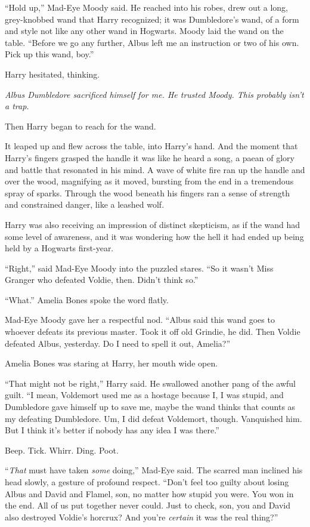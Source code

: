 ``Hold up,'' Mad-Eye Moody said. He reached into his robes, drew out a long, grey-knobbed wand that Harry recognized; it was Dumbledore's wand, of a form and style not like any other wand in Hogwarts. Moody laid the wand on the table. ``Before we go any further, Albus left me an instruction or two of his own. Pick up this wand, boy.''

Harry hesitated, thinking.

\emph{Albus Dumbledore sacrificed himself for me. He trusted Moody. This probably isn't a trap.}

Then Harry began to reach for the wand.

It leaped up and flew across the table, into Harry's hand. And the moment that Harry's fingers grasped the handle it was like he heard a song, a paean of glory and battle that resonated in his mind. A wave of white fire ran up the handle and over the wood, magnifying as it moved, bursting from the end in a tremendous spray of sparks. Through the wood beneath his fingers ran a sense of strength and constrained danger, like a leashed wolf.

Harry was also receiving an impression of distinct skepticism, as if the wand had some level of awareness, and it was wondering how the hell it had ended up being held by a Hogwarts first-year.

``Right,'' said Mad-Eye Moody into the puzzled stares. ``So it wasn't Miss Granger who defeated Voldie, then. Didn't think so.''

``What.'' Amelia Bones spoke the word flatly.

Mad-Eye Moody gave her a respectful nod. ``Albus said this wand goes to whoever defeats its previous master. Took it off old Grindie, he did. Then Voldie defeated Albus, yesterday. Do I need to spell it out, Amelia?''

Amelia Bones was staring at Harry, her mouth wide open.

``That might not be right,'' Harry said. He swallowed another pang of the awful guilt. ``I mean, Voldemort used me as a hostage because I, I was stupid, and Dumbledore gave himself up to save me, maybe the wand thinks that counts as my defeating Dumbledore. Um, I did defeat Voldemort, though. Vanquished him. But I think it's better if nobody has any idea I was there.''

Beep. Tick. Whirr. Ding. Poot.

``\emph{That} must have taken \emph{some} doing,'' Mad-Eye said. The scarred man inclined his head slowly, a gesture of profound respect. ``Don't feel too guilty about losing Albus and David and Flamel, son, no matter how stupid you were. You won in the end. All of us put together never could. Just to check, son, you and David also destroyed Voldie's horcrux? And you're \emph{certain} it was the real thing?''

